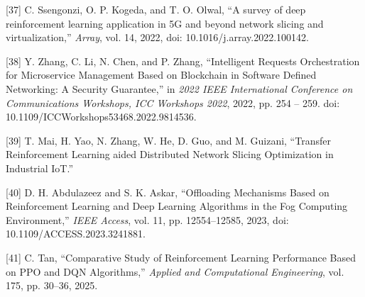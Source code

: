 {[}37{]} C. Ssengonzi, O. P. Kogeda, and T. O. Olwal, ``A survey of deep reinforcement learning application in 5G and beyond network slicing and virtualization,'' \emph{Array}, vol. 14, 2022, doi: 10.1016/j.array.2022.100142.

{[}38{]} Y. Zhang, C. Li, N. Chen, and P. Zhang, ``Intelligent Requests Orchestration for Microservice Management Based on Blockchain in Software Defined Networking: A Security Guarantee,'' in \emph{2022 IEEE International Conference on Communications Workshops, ICC Workshops 2022}, 2022, pp. 254 -- 259. doi: 10.1109/ICCWorkshops53468.2022.9814536.

{[}39{]} T. Mai, H. Yao, N. Zhang, W. He, D. Guo, and M. Guizani, ``Transfer Reinforcement Learning aided Distributed Network Slicing Optimization in Industrial IoT.''

{[}40{]} D. H. Abdulazeez and S. K. Askar, ``Offloading Mechanisms Based on Reinforcement Learning and Deep Learning Algorithms in the Fog Computing Environment,'' \emph{IEEE Access}, vol. 11, pp. 12554--12585, 2023, doi: 10.1109/ACCESS.2023.3241881.

{[}41{]} C. Tan, ``Comparative Study of Reinforcement Learning Performance Based on PPO and DQN Algorithms,'' \emph{Applied and Computational Engineering}, vol. 175, pp. 30--36, 2025.

~
